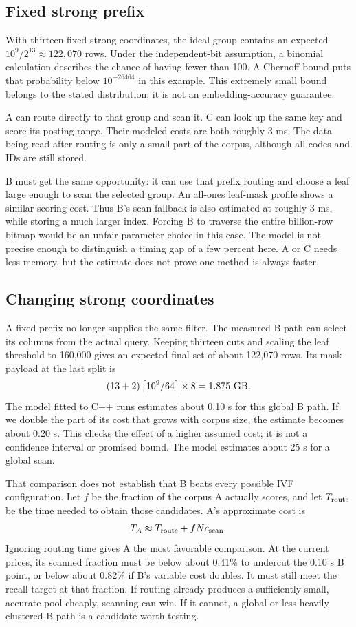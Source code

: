 \subsection{Fixed strong prefix}
With thirteen fixed strong coordinates, the ideal group contains an expected
$10^9/2^{13}\approx122{,}070$ rows. Under the independent-bit assumption, a binomial calculation
describes the chance of having fewer than 100. A Chernoff bound puts that probability below
$10^{-26464}$ in this example. This extremely small bound belongs to the stated distribution;
it is not an embedding-accuracy guarantee.

A can route directly to that group and scan it. C can look up the same key and score its posting
range. Their modeled costs are both roughly 3 ms. The data being read after routing is only a
small part of the corpus, although all codes and IDs are still stored.

B must get the same opportunity: it can use that prefix routing and choose a leaf large enough
to scan the selected group. An all-ones leaf-mask profile shows a similar scoring cost. Thus
B's scan fallback is also estimated at roughly 3 ms, while storing a much larger index. Forcing B to
traverse the entire billion-row bitmap would be an unfair parameter choice in this case.
The model is not precise enough to distinguish a timing gap of a few percent here.
A or C needs less memory, but the estimate does not prove one method is always faster.

\subsection{Changing strong coordinates}
A fixed prefix no longer supplies the same filter. The measured B path can select its columns
from the actual query. Keeping thirteen cuts and scaling the leaf threshold to 160,000 gives
an expected final set of about 122,070 rows. Its mask payload at the last split is
\[
(13+2)\ceil{10^9/64}\times8=1.875\ \mathrm{GB}.
\]
The model fitted to C++ runs estimates about 0.10 s for this global B path. If we double
the part of its cost that grows with corpus size, the estimate becomes about 0.20 s. This
checks the effect of a higher assumed cost; it is not a confidence interval or promised
bound. The model estimates about 25 s for a global scan.

That comparison does not establish that B beats every possible IVF configuration. Let $f$ be
the fraction of the corpus A actually scores, and let $T_{\rm route}$ be the time needed to
obtain those candidates. A's approximate cost is
\[
T_A\approx T_{\rm route}+fN c_{\rm scan}.
\]
Ignoring routing time gives A the most favorable comparison. At the current prices, its
scanned fraction must be below about 0.41\% to undercut the 0.10 s B point, or below about
0.82\% if B's variable cost doubles. It must still meet the recall target at that fraction.
If routing already produces a sufficiently small, accurate pool cheaply, scanning can win.
If it cannot, a global or less heavily clustered B path is a candidate worth testing.

